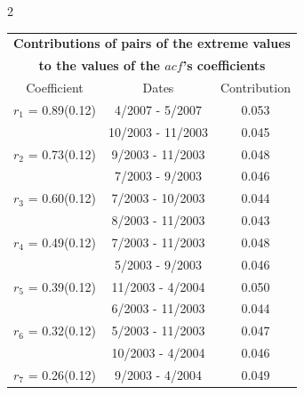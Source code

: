 
\thispagestyle{empty}
\begin{multicols}{2}{ 
\begin{tabular}{ccc}
\multicolumn{3}{c}{\textbf{Contributions of pairs of the extreme values} }  \vspace{-.10in}  \\ 
\multicolumn{3}{c}{ \textbf{to the values of the $acf$'s coefficients}} \\ 
\hline 
\hline                  Coefficient  &  Dates &  Contribution \\ 
\hline 
  $r_{ 1}$ = 0.89(0.12) &       4/2007 -  5/2007 &        0.053   \vspace{-.10in} \\  
&       10/2003 - 11/2003 &        0.045  \vspace{-.02in} \\ \hline 
  $r_{ 2}$ = 0.73(0.12) &       9/2003 - 11/2003 &        0.048   \vspace{-.10in} \\  
&        7/2003 -  9/2003 &        0.046  \vspace{-.02in} \\ \hline 
  $r_{ 3}$ = 0.60(0.12) &       7/2003 - 10/2003 &        0.044   \vspace{-.10in} \\  
&        8/2003 - 11/2003 &        0.043  \vspace{-.02in} \\ \hline 
  $r_{ 4}$ = 0.49(0.12) &       7/2003 - 11/2003 &        0.048   \vspace{-.10in} \\  
&        5/2003 -  9/2003 &        0.046  \vspace{-.02in} \\ \hline 
  $r_{ 5}$ = 0.39(0.12) &      11/2003 -  4/2004 &        0.050   \vspace{-.10in} \\  
&        6/2003 - 11/2003 &        0.044  \vspace{-.02in} \\ \hline 
  $r_{ 6}$ = 0.32(0.12) &       5/2003 - 11/2003 &        0.047   \vspace{-.10in} \\  
&       10/2003 -  4/2004 &        0.046  \vspace{-.02in} \\ \hline 
  $r_{ 7}$ = 0.26(0.12) &       9/2003 -  4/2004 &        0.049   \vspace{-.10in} \\  

\end{tabular}}
\end{multicols}

